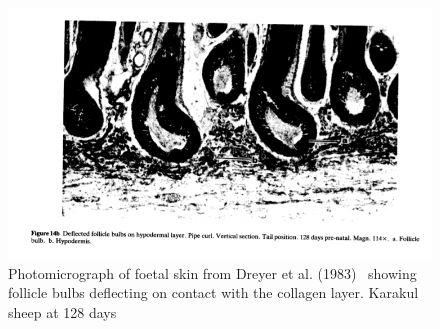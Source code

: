 %

\begin{figure}[]
\centering
    \includegraphics[scale=0.80]{dreyerp6.png}
  \caption{Photomicrograph of foetal skin from Dreyer et al. (1983)~\cite{dreyer-1983} showing follicle bulbs deflecting on contact with the collagen layer. Karakul sheep at 128 days}
\vfill
  \label{fig:dreyer}
\end{figure}

%

